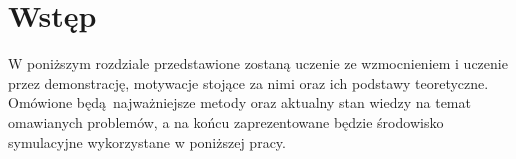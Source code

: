 \section{Wstęp}
W poniższym rozdziale przedstawione zostaną uczenie ze wzmocnieniem i uczenie przez demonstrację, motywacje stojące za nimi oraz ich podstawy teoretyczne. Omówione będą najważniejsze metody oraz aktualny stan wiedzy na temat omawianych problemów, a na końcu zaprezentowane będzie środowisko symulacyjne wykorzystane w poniższej pracy.
